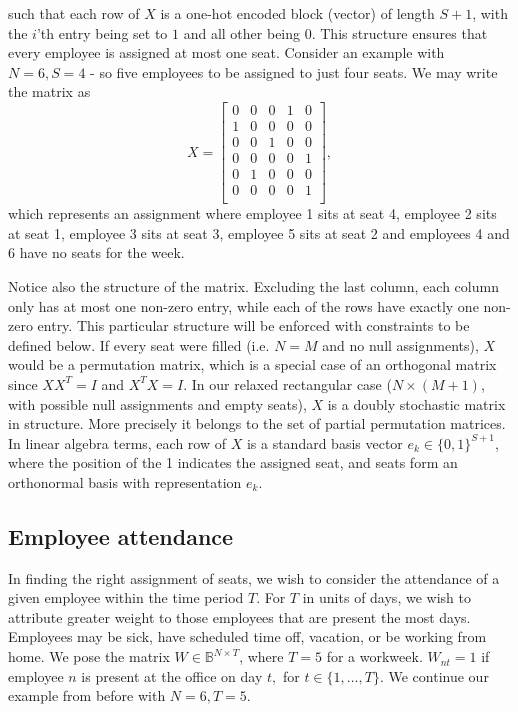 \documentclass[10pt]{article}
\theoremstyle{definition}
\theoremstyle{plain}
\theoremstyle{remark}
\begin{document}
	such that each row of $X$ is a one-hot encoded block (vector) of length $S+1$, with the $i$'th entry being set to $1$ and all other being $0$. This structure ensures that every employee is  assigned at most one seat.
	Consider an example with $N=6, S=4$ - so five employees to be assigned to just four seats. We may write the matrix as
	\begin{equation}
		X = \begin{bmatrix}
				0 & 0 & 0 & 1 & 0 \\
				1 & 0 & 0 & 0 & 0\\
				0 & 0 & 1 & 0 & 0\\
				0 & 0 & 0 & 0 & 1\\
				0 & 1 & 0 & 0 & 0\\
				0 & 0 & 0 & 0 & 1\\
			\end{bmatrix},
	\end{equation}
	which represents an assignment where employee 1 sits at seat 4, employee 2 sits at seat 1, employee 3 sits at seat 3, employee 5 sits at seat 2 and employees 4 and 6 have no seats for the week.
	
	Notice also the structure of the matrix. Excluding the last column, each column only has at most one non-zero entry, while each of the rows have exactly one non-zero entry. This particular structure will be enforced with constraints to be defined below.
	If every seat were filled (i.e. $N=M$ and no null assignments), $X$ would be a permutation matrix, which is a special case of an orthogonal matrix since $XX^T = I$ and $X^TX=I$. In our relaxed rectangular case ($N\times(M+1)$, with possible null assignments and empty seats), $X$ is a doubly stochastic matrix in structure. More precisely it belongs to the set of partial permutation matrices. In linear algebra terms, each row of $X$ is a standard basis vector $e_k\in\{0,1\}^{S+1}$, where the position of the 1 indicates the assigned seat, and seats form an orthonormal basis with representation $e_k$. 
	
	\subsection{Employee attendance}
	In finding the right assignment of seats, we wish to consider the attendance of a given employee within the time period $T$. For $T$ in units of days, we wish to attribute greater weight to those employees that are present the most days. Employees may be sick, have scheduled time off, vacation, or be working from home. We pose the matrix $W\in\mathbb{B}^{N \times T}$, where $T=5$ for a workweek. $W_{nt} = 1$ if employee $n$ is present at the office on day $t,$ for $t\in\{1,\dots,T\}$. We continue our example from before with $N=6, T=5$.
	
\end{document}
